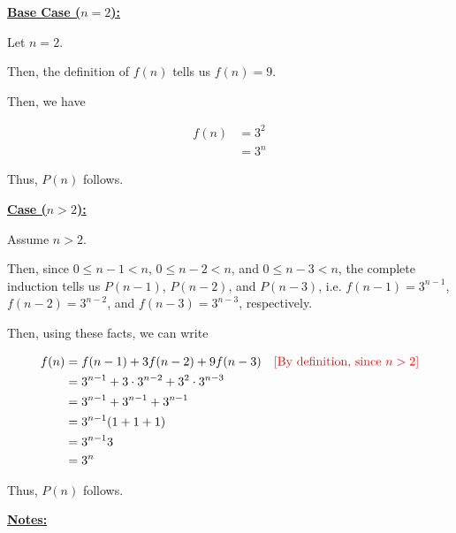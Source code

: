 \documentclass[12pt]{article}
\begin{document}
\begin{mdframed}
    \bigskip

    \underline{\textbf{Base Case ($n = 2$):}}

    \bigskip

    Let $n = 2$.

    \bigskip

    Then, the definition of $f(n)$ tells us $f(n) = 9$.

    \bigskip

    Then, we have

    \begin{align}
        f(n) &= 3^2\\
        &= 3^n
    \end{align}

    \bigskip

    Thus, $P(n)$ follows.

    \bigskip

    \underline{\textbf{Case ($n > 2$):}}

    \bigskip

    Assume $n > 2$.

    \bigskip

    Then, since $0 \leq n - 1 < n$, $0 \leq n -2 < n$, and $0 \leq n - 3 < n$,
    the complete induction tells us $P(n-1)$, $P(n-2)$, and $P(n-3)$, i.e.
    $f(n-1) = 3^{n-1}$, $f(n-2) = 3^{n-2}$, and $f(n-3) = 3^{n-3}$, respectively.

    \bigskip

    Then, using these facts, we can write

    \begin{align}
        f(n) &= f(n-1) + 3f(n-2) + 9f(n-3) & \color{red}[\text{By definition, since $n > 2$}]\color{black}\\
        &= 3^{n-1} + 3 \cdot 3^{n-2} + 3^2 \cdot 3^{n-3}\\
        &= 3^{n-1} + 3^{n-1} + 3^{n-1}\\
        &= 3^{n-1}(1 + 1 + 1)\\
        &= 3^{n-1}3\\
        &= 3^n
    \end{align}

    \bigskip

    Thus, $P(n)$ follows.
    \bigskip
\end{mdframed}

\bigskip

\underline{\textbf{Notes:}}

\bigskip
\end{document}
